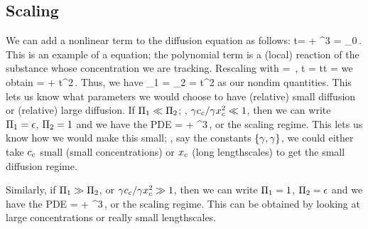 \subsection{Scaling}
We can add a nonlinear term to the diffusion equation as follows:
\beq
\ipd t\conc = \kmdiff\ipd{\lpos\lpos}\conc + \krcoeff\conc^3\quad{}\quad
\conc{} = \conc_0\vat{\lpos}\,.
\eeq
This is an example of a  equation; the polynomial term is a (local) reaction of the substance whose concentration we are tracking. Rescaling with
\beq
\lpos = \chpq\lpos\scpq\lpos\,,\quad
t = \chpq t\scpq t\quad{}\quad
\conc = \chpq\conc\scpq\conc
\eeq
we obtain
\beq
{}\scpq\conc = \kmdiff{}\ipd{\scpq\lpos\scpq\lpos}\scpq\conc 
                          + \krcoeff\chpq t\chpq\conc^2\scpq\conc\,.
\eeq
Thus, we have
\beq
\kdim_1 = \quad{}\quad
\kdim_2 = \krcoeff\chpq t\chpq\conc^2
\eeq
as our nondim quantities. This lets us know what parameters we would choose to have (relative) small diffusion or (relative) large diffusion. If $\Pi_1\ll\Pi_2$; \ie, $\gamma{c}_{c}/\gamma{x}_{c}^2\ll 1$, then we can write $\Pi_1 = \epsilon$, $\Pi_2 = 1$ and we have the PDE
\beq
{}\scpq\conc = \smpq\ipd{\scpq\lpos\scpq\lpos}\scpq\conc + \scpq\conc^3\,,
\eeq
or the  scaling regime. This lets us know how we would make this small; \eg, say the constants $\left\lbrace{\gamma, \gamma}\right\rbrace$, we could either take ${c}_{c}$ small (small concentrations) or ${x}_{c}$ (long lengthscales) to get the small diffusion regime.

Similarly, if $\Pi_1\gg\Pi_2$, or $\gamma{c}_{c}/\gamma{x}_{c}^2\gg 1$, then we can write $\Pi_1 = 1$, $\Pi_2 = \epsilon$ and we have the PDE
\beq
{}\scpq\conc = \ipd{\scpq\lpos\scpq\lpos}\scpq\conc + \smpq\scpq\conc^3\,,
\eeq
or the  scaling regime. This can be obtained by looking at large concentrations or really small lengthscales.
